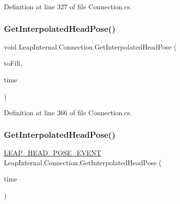 Definition at line 327 of file Connection.\+cs.

\mbox{\label{class_leap_internal_1_1_connection_a96355324ac7bacf3f563a45cebb5f878}} 
\subsubsection{\texorpdfstring{GetInterpolatedHeadPose()}{GetInterpolatedHeadPose()}\hspace{0.1cm}{\footnotesize\ttfamily [1/2]}}
{\footnotesize\ttfamily void Leap\+Internal.\+Connection.\+Get\+Interpolated\+Head\+Pose (\begin{DoxyParamCaption}\item[{ref \mbox{\hyperlink{struct_leap_internal_1_1_l_e_a_p___h_e_a_d___p_o_s_e___e_v_e_n_t}{L\+E\+A\+P\+\_\+\+H\+E\+A\+D\+\_\+\+P\+O\+S\+E\+\_\+\+E\+V\+E\+NT}}}]{to\+Fill,  }\item[{Int64}]{time }\end{DoxyParamCaption})}



Definition at line 366 of file Connection.\+cs.

\mbox{\label{class_leap_internal_1_1_connection_a996b3f40f20bb45366b2f3b063b720b4}} 
\subsubsection{\texorpdfstring{GetInterpolatedHeadPose()}{GetInterpolatedHeadPose()}\hspace{0.1cm}{\footnotesize\ttfamily [2/2]}}
{\footnotesize\ttfamily \mbox{\hyperlink{struct_leap_internal_1_1_l_e_a_p___h_e_a_d___p_o_s_e___e_v_e_n_t}{L\+E\+A\+P\+\_\+\+H\+E\+A\+D\+\_\+\+P\+O\+S\+E\+\_\+\+E\+V\+E\+NT}} Leap\+Internal.\+Connection.\+Get\+Interpolated\+Head\+Pose (\begin{DoxyParamCaption}\item[{Int64}]{time }\end{DoxyParamCaption})}



